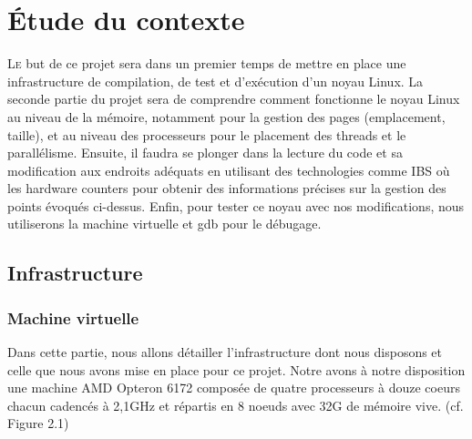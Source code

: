 \chapter{Étude du contexte}

  \lettrine[nindent=0em,lines=3]{L}e but de ce projet sera dans un premier temps
  de mettre en place une infrastructure de compilation, de test et d'exécution
  d'un noyau Linux. La seconde partie du projet sera de comprendre comment
  fonctionne le noyau Linux au niveau de la mémoire, notamment pour la gestion
  des pages (emplacement, taille), et au niveau des processeurs pour le
  placement des threads et le parallélisme. Ensuite, il faudra se plonger dans
  la lecture du code et sa modification aux endroits adéquats en utilisant des
  technologies comme IBS où les hardware counters pour obtenir des informations
  précises sur la gestion des points évoqués ci-dessus. Enfin, pour tester ce
  noyau avec nos modifications, nous utiliserons la machine virtuelle et gdb
  pour le débugage.

  \section{Infrastructure}
    \subsection{Machine virtuelle}
        Dans cette partie, nous allons détailler l'infrastructure dont nous
        disposons et celle que nous avons mise en place pour ce projet. Notre avons
        à notre disposition une machine AMD Opteron 6172 composée de quatre
        processeurs à douze coeurs chacun cadencés à 2,1GHz et répartis en 8 noeuds
        avec 32G de mémoire vive. (cf. Figure 2.1)



